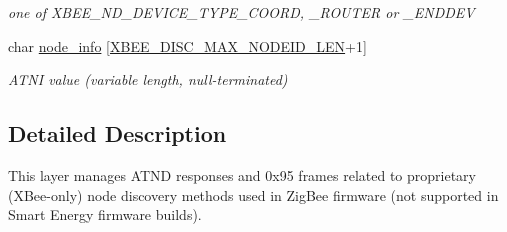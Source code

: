 \begin{DoxyCompactItemize}
\begin{DoxyCompactList}\small\item\em one of X\-B\-E\-E\-\_\-\-N\-D\-\_\-\-D\-E\-V\-I\-C\-E\-\_\-\-T\-Y\-P\-E\-\_\-\-C\-O\-O\-R\-D, \-\_\-\-R\-O\-U\-T\-E\-R or \-\_\-\-E\-N\-D\-D\-E\-V \end{DoxyCompactList}\item 
\hypertarget{group__xbee__discovery_gaa667bab3abb953bc14d9f5bcc36644b8}{char \hyperlink{group__xbee__discovery_gaa667bab3abb953bc14d9f5bcc36644b8}{node\-\_\-info} \mbox{[}\hyperlink{group__xbee__discovery_ga0df6e63d6ccca22fcf154b6f0be46da6}{X\-B\-E\-E\-\_\-\-D\-I\-S\-C\-\_\-\-M\-A\-X\-\_\-\-N\-O\-D\-E\-I\-D\-\_\-\-L\-E\-N}+1\mbox{]}}\label{group__xbee__discovery_gaa667bab3abb953bc14d9f5bcc36644b8}

\begin{DoxyCompactList}\small\item\em A\-T\-N\-I value (variable length, null-\/terminated) \end{DoxyCompactList}\end{DoxyCompactItemize}


\subsection{Detailed Description}
This layer manages A\-T\-N\-D responses and 0x95 frames related to proprietary (X\-Bee-\/only) node discovery methods used in Zig\-Bee firmware (not supported in Smart Energy firmware builds). 

